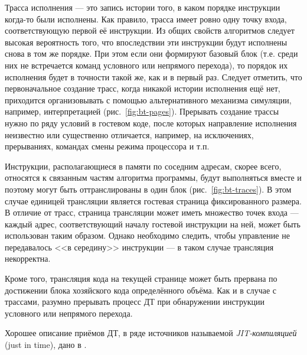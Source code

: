 \begin{enumerate*}
    
\item Трасса исполнения --- это запись истории того, в каком порядке инструкции когда-то были исполнены. Как правило, трасса имеет ровно одну точку входа, соответствующую первой её инструкции. Из общих свойств алгоритмов следует высокая вероятность того, что впоследствии эти инструкции будут исполнены снова в том же порядке. При этом если они формируют базовый блок (т.е. среди них не встречается команд условного или непрямого перехода), то порядок их исполнения будет в точности такой же, как и в первый раз. Следует отметить, что первоначальное создание трасс, когда никакой истории исполнения ещё нет, приходится организовывать с помощью альтернативного механизма симуляции, например, интерпретацией (рис.~\ref{fig:bt-pages}). Прерывать создание трассы нужно по ряду условий в гостевом коде, после которых направление исполнения неизвестно или существенно отличается, например, на исключениях, прерываниях, командах смены режима процессора и т.п. %

\item Инструкции, располагающиеся в памяти по соседним адресам, скорее всего, относятся к связанным частям алгоритма программы, будут выполняться вместе и поэтому могут быть оттранслированы в один блок (рис.~\ref{fig:bt-traces}). В этом случае единицей трансляции является гостевая страница фиксированного размера. В отличие от трасс, страница трансляции может иметь множество точек входа --- каждый адрес, соответствующий началу гостевой инструкции на ней, может быть использован таким образом. Однако необходимо следить, чтобы управление не передавалось <<в середину>> инструкции --- в таком случае трансляция некорректна.

Кроме того, трансляция кода на текущей странице может быть прервана по достижении блока хозяйского кода определённого объёма. Как и в случае с трассами, разумно прерывать процесс ДТ при обнаружении инструкции условного или непрямого перехода. 

\end{enumerate*}

Хорошее описание приёмов ДТ, в ряде источников называемой \textit{JIT-компиляцией} (\abbr just in time), дано в \cite{TophamJones2007}.


